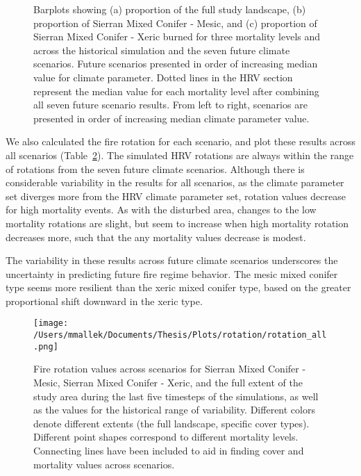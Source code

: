 \documentclass[12pt]{article}
\begin{document}
\begin{spacing}{1}
\begin{figure}[!htbp]
    \caption{Barplots showing (a) proportion of the full study landscape, (b) proportion of Sierran Mixed Conifer - Mesic, and (c) proportion of Sierran Mixed Conifer - Xeric burned for three mortality levels and across the historical simulation and the seven future climate scenarios. Future scenarios presented in order of increasing median value for climate parameter. Dotted lines in the HRV section represent the median value for each mortality level after combining all seven future scenario results. From left to right, scenarios are presented in order of increasing median climate parameter value.}
  \label{fig:dareacomp}
\end{figure}

We also calculated the fire rotation for each scenario, and plot these results across all scenarios (Table~\ref{fig:frotation}). The simulated HRV rotations are always within the range of rotations from the seven future climate scenarios. Although there is considerable variability in the results for all scenarios, as the climate parameter set diverges more from the HRV climate parameter set, rotation values decrease for high mortality events. As with the disturbed area, changes to the low mortality rotations are slight, but seem to increase when high mortality rotation decreases more, such that the any mortality values decrease is modest. 

The variability in these results across future climate scenarios underscores the uncertainty in predicting future fire regime behavior. The mesic mixed conifer type seems more resilient than the xeric mixed conifer type, based on the greater proportional shift downward in the xeric type.


\begin{figure}
\centering
\texttt{[image: /Users/mmallek/Documents/Thesis/Plots/rotation/rotation\_all.png]}
\caption{Fire rotation values across scenarios for Sierran Mixed Conifer - Mesic, Sierran Mixed Conifer - Xeric, and the full extent of the study area during the last five timesteps of the simulations, as well as the values for the historical range of variability. Different colors denote different extents (the full landscape, specific cover types). Different point shapes correspond to different mortality levels. Connecting lines have been included to aid in finding cover and mortality values across scenarios.}
\label{fig:frotation}
\end{figure}



\end{spacing}
\end{document}
